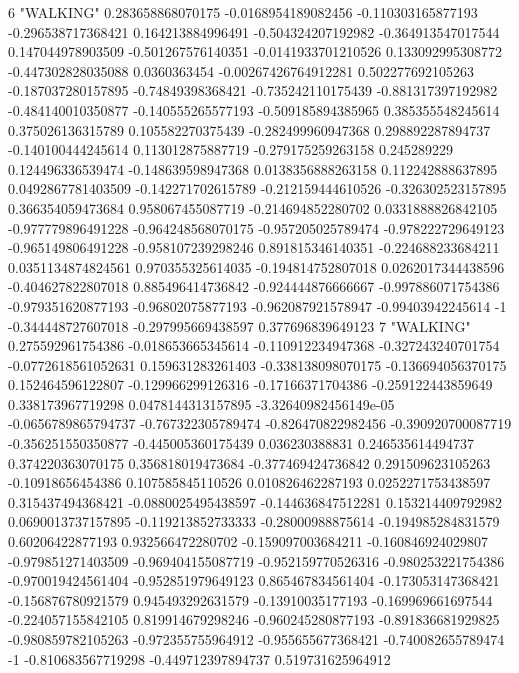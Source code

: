 6 "WALKING" 0.283658868070175 -0.0168954189082456 -0.110303165877193 -0.296538717368421 0.164213884996491 -0.504324207192982 -0.364913547017544 0.147044978903509 -0.501267576140351 -0.0141933701210526 0.133092995308772 -0.447302828035088 0.0360363454 -0.00267426764912281 0.502277692105263 -0.187037280157895 -0.74849398368421 -0.735242110175439 -0.881317397192982 -0.484140010350877 -0.140555265577193 -0.509185894385965 0.385355548245614 0.375026136315789 0.105582270375439 -0.282499960947368 0.298892287894737 -0.140100444245614 0.113012875887719 -0.279175259263158 0.245289229 0.124496336539474 -0.148639598947368 0.0138356888263158 0.112242888637895 0.0492867781403509 -0.142271702615789 -0.212159444610526 -0.326302523157895 0.366354059473684 0.958067455087719 -0.214694852280702 0.0331888826842105 -0.977779896491228 -0.964248568070175 -0.957205025789474 -0.978222729649123 -0.965149806491228 -0.958107239298246 0.891815346140351 -0.224688233684211 0.0351134874824561 0.970355325614035 -0.194814752807018 0.0262017344438596 -0.404627822807018 0.885496414736842 -0.924444876666667 -0.997886071754386 -0.979351620877193 -0.96802075877193 -0.962087921578947 -0.99403942245614 -1 -0.344448727607018 -0.297995669438597 0.377696839649123
7 "WALKING" 0.275592961754386 -0.018653665345614 -0.110912234947368 -0.327243240701754 -0.0772618561052631 0.159631283261403 -0.338138098070175 -0.136694056370175 0.152464596122807 -0.129966299126316 -0.17166371704386 -0.259122443859649 0.338173967719298 0.0478144313157895 -3.32640982456149e-05 -0.0656789865794737 -0.767322305789474 -0.826470822982456 -0.390920700087719 -0.356251550350877 -0.445005360175439 0.036230388831 0.246535614494737 0.374220363070175 0.356818019473684 -0.377469424736842 0.291509623105263 -0.10918656454386 0.107585845110526 0.010826462287193 0.0252271753438597 0.315437494368421 -0.0880025495438597 -0.144636847512281 0.153214409792982 0.0690013737157895 -0.119213852733333 -0.28000988875614 -0.194985284831579 0.60206422877193 0.932566472280702 -0.159097003684211 -0.160846924029807 -0.979851271403509 -0.969404155087719 -0.952159770526316 -0.980253221754386 -0.970019424561404 -0.952851979649123 0.865467834561404 -0.173053147368421 -0.156876780921579 0.945493292631579 -0.13910035177193 -0.169969661697544 -0.224057155842105 0.819914679298246 -0.960245280877193 -0.891836681929825 -0.980859782105263 -0.972355755964912 -0.955655677368421 -0.740082655789474 -1 -0.810683567719298 -0.449712397894737 0.519731625964912
